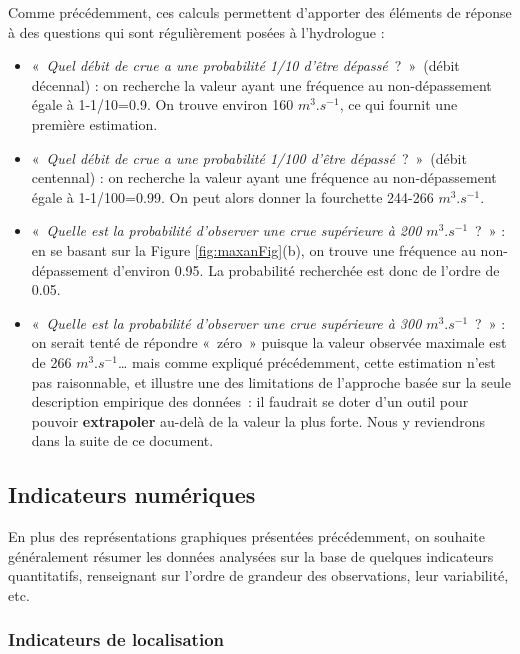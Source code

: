 \documentclass[
]{book}
\providecommand{\tightlist}{%
  \setlength{\itemsep}{0pt}\setlength{\parskip}{0pt}}
\begin{document}
Comme précédemment, ces calculs permettent d'apporter des éléments de réponse à des questions qui sont régulièrement posées à l'hydrologue :

\begin{itemize}
\tightlist
\item
  «~\emph{Quel débit de crue a une probabilité 1/10 d'être dépassé}~?~»~(débit décennal) : on recherche la valeur ayant une fréquence au non-dépassement égale à 1-1/10=0.9. On trouve environ 160 \(m^3.s^{-1}\), ce qui fournit une première estimation.
\item
  «~\emph{Quel débit de crue a une probabilité 1/100 d'être dépassé}~?~»~(débit centennal) : on recherche la valeur ayant une fréquence au non-dépassement égale à 1-1/100=0.99. On peut alors donner la fourchette 244-266 \(m^3.s^{-1}\).
\item
  «~\emph{Quelle est la probabilité d'observer une crue supérieure à 200 \(m^3.s^{-1}\)}~?~» : en se basant sur la Figure \ref{fig:maxanFig}(b), on trouve une fréquence au non-dépassement d'environ 0.95. La probabilité recherchée est donc de l'ordre de 0.05.
\item
  «~\emph{Quelle est la probabilité d'observer une crue supérieure à 300 \(m^3.s^{-1}\)}~?~» : on serait tenté de répondre «~zéro~» puisque la valeur observée maximale est de 266 \(m^3.s^{-1}\)\ldots{} mais comme expliqué précédemment, cette estimation n'est pas raisonnable, et illustre une des limitations de l'approche basée sur la seule description empirique des données~: il faudrait se doter d'un outil pour pouvoir \textbf{extrapoler} au-delà de la valeur la plus forte. Nous y reviendrons dans la suite de ce document.
\end{itemize}

\subsection{Indicateurs numériques}\label{indicateurs-numuxe9riques}

En plus des représentations graphiques présentées précédemment, on souhaite généralement résumer les données analysées sur la base de quelques indicateurs quantitatifs, renseignant sur l'ordre de grandeur des observations, leur variabilité, etc.

\subsubsection{Indicateurs de localisation}\label{indicateurs-de-localisation}
\end{document}
